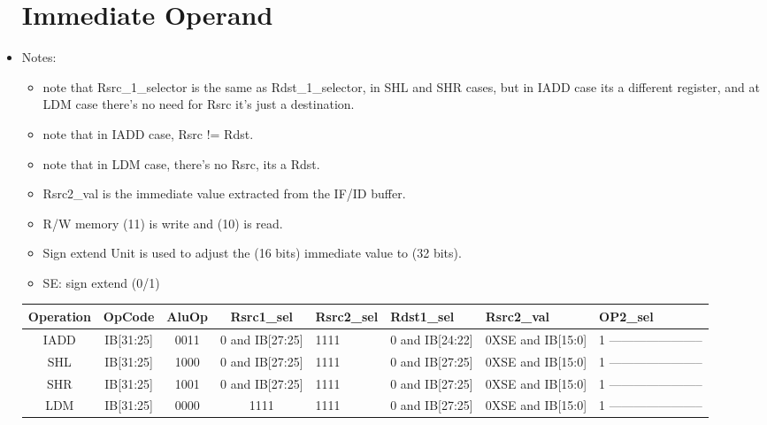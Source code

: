 \documentclass[12pt]{report}
\begin{document}
\begin{itemize}
\begin{center}
\begin{tabular}{||c| c| c| c| p{40mm}||}
        \end{tabular}
        \end{center}


        \section{Immediate Operand}
        \item Notes:
        \begin{itemize}
            \item note that Rsrc_1_selector is the same as Rdst_1_selector, in SHL and SHR cases, but in IADD case its a different register, and at LDM case there's no need for Rsrc it's just a destination.
            \item note that in IADD case, Rsrc != Rdst.
            \item note that in LDM case, there's no Rsrc, its a Rdst.
            \item Rsrc2_val is the immediate value extracted from the IF/ID buffer.
            \item R/W memory (11) is write and (10) is read.
            \item Sign extend Unit is used to adjust the (16 bits) immediate value to (32 bits).
            \item SE: sign extend (0/1)
        \end{itemize}

        \begin{center}
        \begin{tabular}{||c| c| c| c| p{40mm}||} 
        \hline
        Operation & OpCode & AluOp & Rsrc1_sel & Rsrc2_sel & Rdst1_sel & Rsrc2_val & OP2_sel  \\ [0.5ex] 
        \hline\hline
        IADD& IB[31:25] & 0011 & 0 and IB[27:25] & 1111 & 0 and IB[24:22] & 0XSE and IB[15:0] & 1 ----------------------- \\
        \hline
        SHL & IB[31:25] & 1000 & 0 and IB[27:25] & 1111 & 0 and IB[27:25] & 0XSE and IB[15:0] & 1 ----------------------- \\
        \hline
        SHR & IB[31:25] & 1001 & 0 and IB[27:25] & 1111 & 0 and IB[27:25] & 0XSE and IB[15:0] & 1 ----------------------- \\
        \hline
        LDM & IB[31:25] & 0000 & 1111 & 1111 & 0 and IB[27:25] & 0XSE and IB[15:0] & 1 ----------------------- \\
        \hline


\end{tabular}
\end{center}
\end{itemize}
\end{document}
